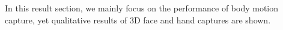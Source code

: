 In this result section, we mainly focus on the performance of body motion capture, yet qualitative results of 3D face and hand captures are shown. 



